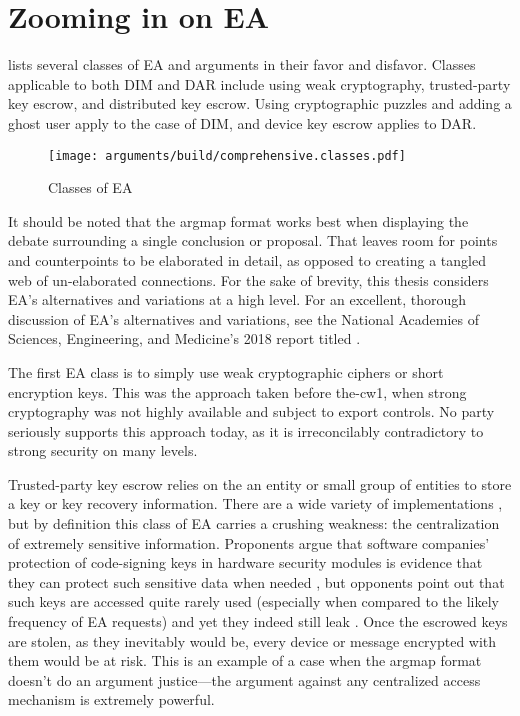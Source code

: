 \section{Zooming in on EA}
\label{sec-ea-types}

 lists several classes of \ac{EA} and arguments in their favor and disfavor. Classes applicable
to both \ac{DIM} and \ac{DAR} include using weak cryptography, trusted-party key escrow, and distributed key escrow.
Using cryptographic puzzles and adding a ghost user apply to the case of \ac{DIM}, and device key escrow applies to
\ac{DAR}.

\begin{sidewaysfigure}[p!]
  \centering\CaptionFontSize
  \texttt{[image: arguments/build/comprehensive.classes.pdf]}
  \caption{Classes of EA}
  \label{fig-arg-classes}
\end{sidewaysfigure}

It should be noted that the \ac{argmap} format works best when displaying the debate surrounding a single conclusion or
proposal. That leaves room for points and counterpoints to be elaborated in detail, as opposed to creating a tangled web
of un-elaborated connections. For the sake of brevity, this thesis considers \ac{EA}'s alternatives and variations at a
high level. For an excellent, thorough discussion of \ac{EA}'s alternatives and variations, see the National Academies
of Sciences, Engineering, and Medicine's 2018 report titled  \cite{committee_decrypting_2018}.

The first \ac{EA} class is to simply use weak cryptographic ciphers or short encryption keys. This was the approach
taken before \ac{the-cw1}, when strong cryptography was not highly available and subject to export controls. No party
seriously supports this approach today, as it is irreconcilably contradictory to strong security on many levels.

Trusted-party key escrow relies on the an entity or small group of entities to store a key or key recovery information.
There are a wide variety of implementations \cite{denning_taxonomy_1996}, but by definition this class of \ac{EA}
carries a crushing weakness: the centralization of extremely sensitive information. Proponents argue that software
companies' protection of code-signing keys in hardware security modules is evidence that they can protect such sensitive
data when needed \cite{ozzie_2018}, but opponents point out that such keys are accessed quite rarely used (especially
when compared to the likely frequency of \ac{EA} requests) and yet they indeed still leak \cite{green_2018}. Once the
escrowed keys are stolen, as they inevitably would be, every device or message encrypted with them would be at risk.
This is an example of a case when the \ac{argmap} format doesn't do an argument justice---the argument against any
centralized access mechanism is extremely powerful.

